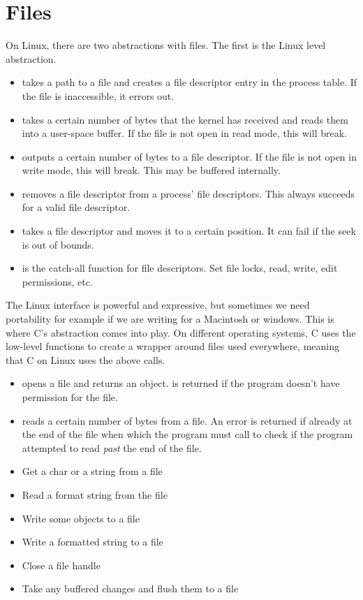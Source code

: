 	\section{Files}
	 
	On Linux, there are two abstractions with files. The first is the Linux  level abstraction.
	 
	 \begin{itemize}
	\item {} takes a path to a file and creates a file descriptor entry in the process table. If the file is inaccessible, it errors out.
	\item {} takes a certain number of bytes that the kernel has received and reads them into a user-space buffer. If the file is not open in read mode, this will break.
	\item {} outputs a certain number of bytes to a file descriptor. If the file is not open in write mode, this will break. This may be buffered internally.
	\item {} removes a file descriptor from a process' file descriptors. This always succeeds for a valid file descriptor.
	\item {} takes a file descriptor and moves it to a certain position. It can fail if the seek is out of bounds.
	\item {} is the catch-all function for file descriptors. Set file locks, read, write, edit permissions, etc.
	 \end{itemize}
	 
	The Linux interface is powerful and expressive, but sometimes we need portability for example if we are writing for a Macintosh or windows.
	This is where C's abstraction comes into play.
	On different operating systems, C uses the low-level functions to create a wrapper around files used everywhere, meaning that C on Linux uses the above calls.
	 
	\begin{itemize}
	\item {} opens a file and returns an object.  is returned if the program doesn't have permission for the file.
	\item {} reads a certain number of bytes from a file. An error is returned if already at the end of the file when which the program must call  to check if the program attempted to read \textit{past} the end of the file.
	\item {} Get a char or a string from a file
	\item {} Read a format string from the file
	\item {} Write some objects to a file
	\item {} Write a formatted string to a file
	\item {} Close a file handle
	\item {} Take any buffered changes and flush them to a file
	\end{itemize}
	 
